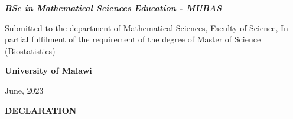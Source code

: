 \documentclass[12pt,a4paper]{report}
\begin{document}
		\begin{large}
			\begin{center}
				\bf{\textit{BSc in Mathematical Sciences Education - MUBAS}}\\
			\end{center}
		\end{large}  
		
		\begin{center}
			Submitted to the department of Mathematical Sciences, Faculty of Science, 
			In partial fulfilment of the requirement of the degree of Master of Science (Biostatistics)\\
		\end{center}
		
		\par \bigskip 
		
		
		\begin{large}
			\begin{center}
				\bf{University of Malawi}\\
			\end{center}
		\end{large}
		
		\par 
		
		\begin{large}
			\begin{center}
				June, 2023\\
			\end{center}
		\end{large}


\newpage

\thispagestyle{empty}



\begin{large}
\begin{center}
\bf{DECLARATION}\\
\end{center}
\end{large}

\par \bigskip

{}\\
\end{document}
